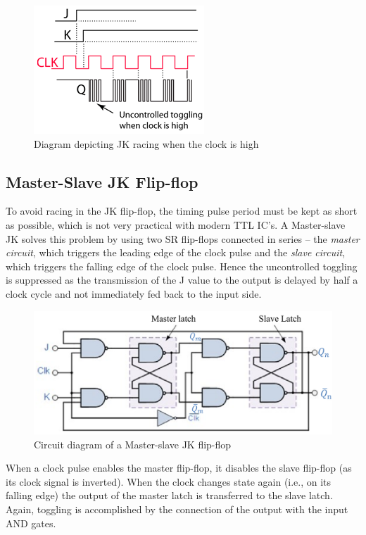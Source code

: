 \begin{figure}[H]
    \centering
    \includegraphics[width=0.55\columnwidth]{images/jkrace1.png}
    \caption{Diagram depicting JK racing when the clock is high}
    \label{race0}
\end{figure}

\subsection*{Master-Slave JK Flip-flop}
To avoid racing in the JK flip-flop, the timing pulse period must be kept as short as possible, which is not very practical with modern TTL IC's. A Master-slave JK solves this problem by using two SR flip-flops connected in series -- the \textit{master circuit}, which triggers the leading edge of the clock pulse and the \textit{slave circuit}, which triggers the falling edge of the clock pulse. Hence the uncontrolled toggling is suppressed as the transmission of the J value to the output is delayed by half a clock cycle and not immediately fed back to the input side.

\begin{figure}[H]
    \centering
    \includegraphics[width=0.90\columnwidth]{images/msjk.png}
    \caption{Circuit diagram of a Master-slave JK flip-flop}
    \label{5}
\end{figure}

When a clock pulse enables the master flip-flop, it disables the slave flip-flop (as its clock signal is inverted). When the clock
changes state again (i.e., on its falling edge) the output of the master latch is transferred
to the slave latch. Again, toggling is accomplished by the connection of the output with
the input AND gates.

